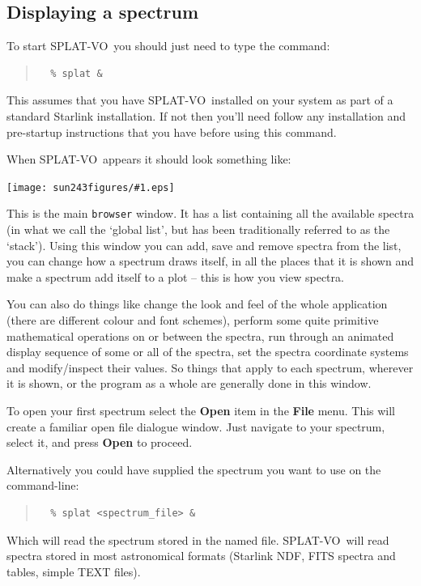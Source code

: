 \documentclass[twoside,11pt]{article}
\newcommand{\htmladdimg}[1]{}
\newcommand{\latexhtml}[2]{#1}
\renewcommand{\_}{\texttt{\symbol{95}}}
\newcommand{\SPLAT}{\textsf{SPLAT-VO}}
\newcommand{\mainfigure}[1]
{\begin{center}
 \latexhtml{\texttt{[image: sun243\_figures/\#1.eps]}}{\htmladdimg{#1.gif}}
 \end{center}
}
\newcommand{\menuitem}[1]{\textbf{#1}}
\newcommand{\hitext}[1]{\texttt{#1}}
\begin{document}
\newpage
\subsection{Displaying a spectrum}

To start \SPLAT\ you should just need to type the command:
\begin{quote}
\begin{verbatim}
  % splat &
\end{verbatim}
\end{quote}
This assumes that you have \SPLAT\ installed on your system as part of a
standard Starlink installation. If not then you'll need follow any
installation and pre-startup instructions that you have before using
this command.

When \SPLAT\ appears it should look something like:

\mainfigure{browser1}

This is the main \hitext{browser} window. It has a list containing all
the available spectra (in what we call the `global list', but has been
traditionally referred to as the `stack'). Using this window you can
add, save and remove spectra from the list, you can change how a
spectrum draws itself, in all the places that it is shown and make a
spectrum add itself to a plot -- this is how you view spectra.

You can also do things like change the look and feel of the whole
application (there are different colour and font schemes), perform
some quite primitive mathematical operations on or between the
spectra, run through an animated display sequence of some or all of the
spectra, set the spectra coordinate systems and modify/inspect their
values. So things that apply to each spectrum, wherever it is shown,
or the program as a whole are generally done in this window.

To open your first spectrum select the \menuitem{Open} item in the
\menuitem{File} menu. This will create a familiar open file dialogue
window. Just navigate to your spectrum, select it, and press
\menuitem{Open} to proceed.

Alternatively you could have supplied the spectrum you want to use on
the command-line:
\begin{quote}
\begin{verbatim}
  % splat <spectrum_file> &
\end{verbatim}
\end{quote}
Which will read the spectrum stored in the named file. \SPLAT\ will read
spectra stored in most astronomical formats (Starlink NDF, FITS spectra and
tables, simple TEXT files).
\end{document}
